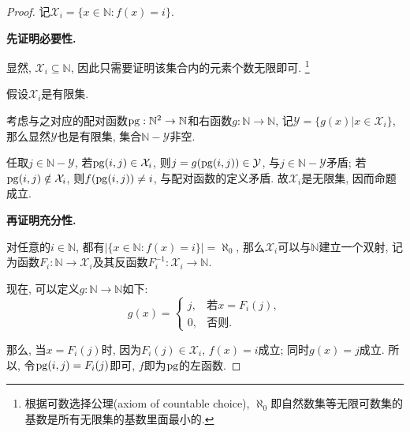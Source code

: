\begin{proof}
    记$\mathcal{X}_i=\{x\in\mathbb{N}:f(x)=i\}$.

    \textbf{先证明必要性.}

    显然, $\mathcal{X}_i\subseteq\mathbb{N}$, 因此只需要证明该集合内的元素个数无限即可. \footnote{根据可数选择公理(axiom of countable choice), $\aleph_0$即自然数集等无限可数集的基数是所有无限集的基数里面最小的.}

    假设$\mathcal{X}_i$是有限集.

    考虑与之对应的配对函数$\mathrm{pg}:\mathbb{N}^2\to\mathbb{N}$和右函数$g:\mathbb{N}\to\mathbb{N}$, 记$\mathcal{Y}=\{g(x)|x\in\mathcal{X}_i\}$, 那么显然$\mathcal{Y}$也是有限集, 集合$\mathbb{N}-\mathcal{Y}$非空.

    任取$j\in\mathbb{N}-\mathcal{Y}$, 若$\mathrm{pg}(i,j)\in\mathcal{X}_i$, 则$j=g(\mathrm{pg}(i,j))\in\mathcal{Y}$, 与$j\in\mathbb{N}-\mathcal{Y}$矛盾; 若$\mathrm{pg}(i,j)\notin\mathcal{X}_i$, 则$f(\mathrm{pg}(i,j)) \neq i$, 与配对函数的定义矛盾. 故$\mathcal{X}_i$是无限集, 因而命题成立.

    \textbf{再证明充分性.}

    对任意的$i\in\mathbb{N}$, 都有$|\{x\in\mathbb{N}:f(x)=i\}|=\aleph_0$, 那么$\mathcal{X}_i$可以与$\mathbb{N}$建立一个双射, 记为函数$F_i:\mathbb{N}\to\mathcal{X}_i$及其反函数$F_i^{-1}:\mathcal{X}_i\to\mathbb{N}$.

    现在, 可以定义$g:\mathbb{N}\to\mathbb{N}$如下:
    $$g(x)=\begin{cases}
        j,&\textrm{若} x=F_i(j),\\
        0,&\textrm{否则}.
    \end{cases}$$
	
    那么, 当$x=F_i(j)$时, 因为$F_i(j)\in\mathcal{X}_i$, $f(x)=i$成立; 同时$g(x)=j$成立. 所以, 令$\mathrm{pg}(i,j)=F_i(j)$即可, $f$即为$\mathrm{pg}$的左函数.
\end{proof}